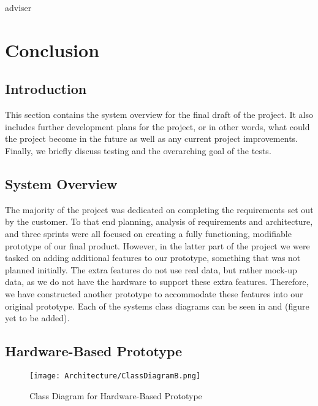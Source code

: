 adviser\documentclass[../document]{subfiles}
\begin{document}
\section{Conclusion}

\subsection{Introduction}
This section contains the system overview for the final draft of the project. It also includes further development plans for the project, or in other words, what could the project become in the future as well as any current project improvements. Finally, we briefly discuss testing and the overarching goal of the tests.

\subsection{System Overview}
The majority of the project was dedicated on completing the requirements set out by the customer. To that end planning, analysis of requirements and architecture, and three sprints were all focused on creating a fully functioning, modifiable prototype of our final product. However, in the latter part of the project we were tasked on adding additional features to our prototype, something that was not planned initially. The extra features do not use real data, but rather mock-up data, as we do not have the hardware to support these extra features. Therefore, we have constructed another prototype to accommodate these features into our original prototype. Each of the systems class diagrams can be seen in  and {\color{red} (figure yet to be added)}.

\subsection{Hardware-Based Prototype}

\begin{figure}[H]
\centering
\texttt{[image: Architecture/ClassDiagramB.png]}
\caption{Class Diagram for Hardware-Based Prototype}
\label{fig:ClassDiagramB}
\end{figure}
\end{document}
